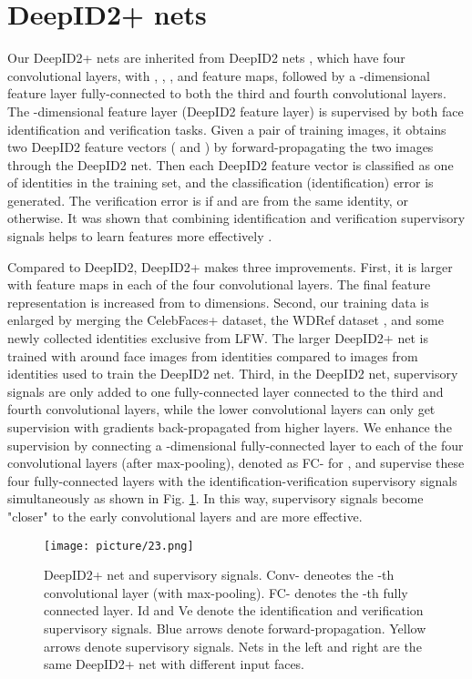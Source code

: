 \documentclass[10pt,twocolumn,letterpaper]{article}
\begin{document}
\section{DeepID2+ nets}

Our DeepID2+ nets are inherited from DeepID2 nets \cite{sun2014b}, which have four convolutional layers, with , , , and   feature maps, followed by a -dimensional feature layer fully-connected to both the third and fourth convolutional layers. The -dimensional feature layer (DeepID2 feature layer) is supervised by both face identification and verification tasks. Given a pair of training  images, it  obtains two DeepID2 feature vectors ( and ) by forward-propagating the two images through the DeepID2 net. Then each DeepID2 feature vector is classified as one of  identities in the training set, and the classification (identification) error is generated. The verification error is  if  and  are from the same identity, or  otherwise. It was shown that combining identification and verification supervisory signals helps to learn features more effectively \cite{sun2014b}.

Compared to DeepID2, DeepID2+ makes three improvements. First, it is larger with  feature maps in each of the four convolutional layers. The final feature representation is increased from  to  dimensions. Second, our training data is  enlarged by merging the CelebFaces+ dataset\cite{sun2014a}, the WDRef dataset \cite{chen2012}, and some newly collected identities exclusive from LFW. The larger DeepID2+ net is trained with around  face images from  identities compared to  images from  identities used to train the DeepID2 net. Third, in the DeepID2 net, supervisory signals are only added to one fully-connected layer connected to the third and fourth convolutional layers, while the lower convolutional layers can only get supervision with gradients back-propagated from higher layers. We enhance the supervision by connecting a -dimensional fully-connected layer to each of the four convolutional layers (after max-pooling), denoted as FC- for , and supervise these four fully-connected layers with the identification-verification supervisory signals \cite{sun2014b} simultaneously as shown in Fig. \ref{fig:cnn}. In this way, supervisory signals become "closer" to the early convolutional layers and are more effective.

\begin{figure}[t]
\begin{center}
\texttt{[image: picture/23.png]}
\end{center}
\vspace{-0.15in}
\caption{DeepID2+ net and  supervisory signals. Conv- deneotes the -th convolutional layer (with max-pooling). FC- denotes the -th fully connected layer. Id and Ve denote the identification and verification supervisory signals. Blue arrows denote forward-propagation. Yellow arrows denote supervisory signals. Nets in the left and right are the same DeepID2+ net with different input faces.}
\label{fig:cnn}
\vspace{-0.1in}
\end{figure}
\end{document}
